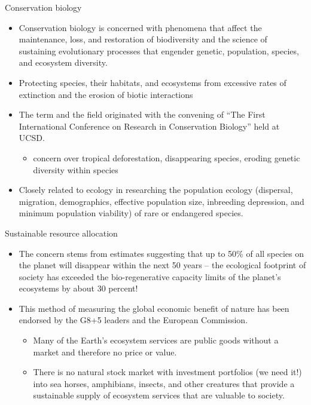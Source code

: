 \documentclass[
  ignorenonframetext,
  aspectratio=169]{beamer}
\providecommand{\tightlist}{%
  \setlength{\itemsep}{0pt}\setlength{\parskip}{0pt}}
\begin{document}
\begin{frame}{Conservation biology}
\protect\hypertarget{conservation-biology}{}
\begin{itemize}
\tightlist
\item
  Conservation biology is concerned with phenomena that affect the
  maintenance, loss, and restoration of biodiversity and the science of
  sustaining evolutionary processes that engender genetic, population,
  species, and ecosystem diversity.
\item
  Protecting species, their habitats, and ecosystems from excessive
  rates of extinction and the erosion of biotic interactions
\item
  The term and the field originated with the convening of ``The First
  International Conference on Research in Conservation Biology'' held at
  UCSD.

  \begin{itemize}
  \tightlist
  \item
    concern over tropical deforestation, disappearing species, eroding
    genetic diversity within species
  \end{itemize}
\item
  Closely related to ecology in researching the population ecology
  (dispersal, migration, demographics, effective population size,
  inbreeding depression, and minimum population viability) of rare or
  endangered species.
\end{itemize}
\end{frame}

\begin{frame}{Sustainable resource allocation}
\protect\hypertarget{sustainable-resource-allocation}{}
\begin{itemize}
\tightlist
\item
  The concern stems from estimates suggesting that up to 50\% of all
  species on the planet will disappear within the next 50 years -- the
  ecological footprint of society has exceeded the bio-regenerative
  capacity limits of the planet's ecosystems by about 30 percent!
\item
  This method of measuring the global economic benefit of nature has
  been endorsed by the G8+5 leaders and the European Commission.

  \begin{itemize}
  \tightlist
  \item
    Many of the Earth's ecosystem services are public goods without a
    market and therefore no price or value.
  \item
    There is no natural stock market with investment portfolios (we need
    it!) into sea horses, amphibians, insects, and other creatures that
    provide a sustainable supply of ecosystem services that are valuable
    to society.
  \end{itemize}
\end{itemize}
\end{frame}
\end{document}
